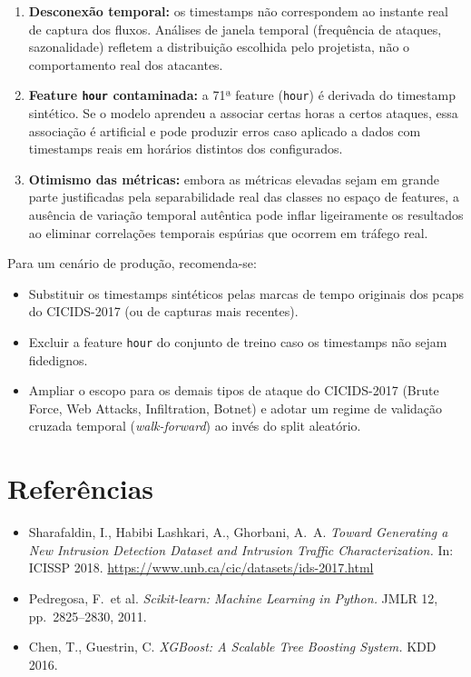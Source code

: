 \documentclass[12pt,a4paper]{article}
\begin{document}
\begin{enumerate}
  \item \textbf{Desconexão temporal:} os timestamps não correspondem ao instante
        real de captura dos fluxos. Análises de janela temporal (frequência de
        ataques, sazonalidade) refletem a distribuição escolhida pelo projetista,
        não o comportamento real dos atacantes.

  \item \textbf{Feature \texttt{hour} contaminada:} a 71ª feature (\texttt{hour})
        é derivada do timestamp sintético. Se o modelo aprendeu a associar certas
        horas a certos ataques, essa associação é artificial e pode produzir erros
        caso aplicado a dados com timestamps reais em horários distintos dos
        configurados.

  \item \textbf{Otimismo das métricas:} embora as métricas elevadas sejam em
        grande parte justificadas pela separabilidade real das classes no espaço
        de features, a ausência de variação temporal autêntica pode inflar
        ligeiramente os resultados ao eliminar correlações temporais espúrias
        que ocorrem em tráfego real.
\end{enumerate}

Para um cenário de produção, recomenda-se:
\begin{itemize}
  \item Substituir os timestamps sintéticos pelas marcas de tempo originais dos
        pcaps do CICIDS-2017 (ou de capturas mais recentes).
  \item Excluir a feature \texttt{hour} do conjunto de treino caso os timestamps
        não sejam fidedignos.
  \item Ampliar o escopo para os demais tipos de ataque do CICIDS-2017
        (Brute Force, Web Attacks, Infiltration, Botnet) e adotar um regime de
        validação cruzada temporal (\emph{walk-forward}) ao invés do split
        aleatório.
\end{itemize}

\section*{Referências}

\begin{itemize}
  \item Sharafaldin, I., Habibi Lashkari, A., Ghorbani, A.\ A. \textit{Toward
        Generating a New Intrusion Detection Dataset and Intrusion Traffic
        Characterization.} In: ICISSP 2018.
        \url{https://www.unb.ca/cic/datasets/ids-2017.html}

  \item Pedregosa, F.\ et al. \textit{Scikit-learn: Machine Learning in Python.}
        JMLR 12, pp.\ 2825--2830, 2011.

  \item Chen, T., Guestrin, C. \textit{XGBoost: A Scalable Tree Boosting System.}
        KDD 2016.
\end{itemize}
\end{document}

